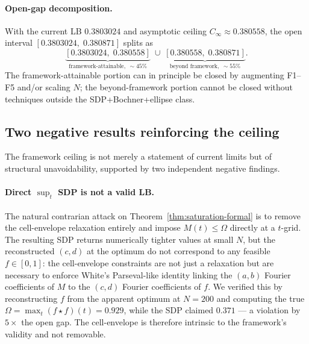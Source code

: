 \documentclass[11pt]{article}
\theoremstyle{plain}
\theoremstyle{definition}
\begin{document}
\paragraph{Open-gap decomposition.}
With the current LB $0.3803024$ and asymptotic ceiling
$C_\infty \approx 0.380558$, the open interval
$[0.3803024,\; 0.380871]$ splits as
\[
\underbrace{[0.3803024,\; 0.380558]}_{\text{framework-attainable},\;\sim 45\%}
\;\cup\;
\underbrace{[0.380558,\; 0.380871]}_{\text{beyond framework},\;\sim 55\%}.
\]
The framework-attainable portion can in principle be closed by
augmenting F1--F5 and/or scaling $N$; the beyond-framework portion
cannot be closed without techniques outside the SDP+Bochner+ellipse
class.

\subsection{Two negative results reinforcing the ceiling}

The framework ceiling is not merely a statement of current limits but
of structural unavoidability, supported by two independent negative
findings.

\paragraph{Direct $\sup_t$ SDP is not a valid LB.} The natural
contrarian attack on Theorem~\ref{thm:saturation-formal} is to remove
the cell-envelope relaxation entirely and impose $M(t) \le \Omega$
directly at a $t$-grid. The resulting SDP returns numerically tighter
values at small $N$, but the reconstructed $(c, d)$ at the optimum do
not correspond to any feasible $f \in [0, 1]$: the cell-envelope
constraints are not just a relaxation but are necessary to enforce
White's Parseval-like identity linking the $(a, b)$ Fourier
coefficients of $M$ to the $(c, d)$ Fourier coefficients of $f$. We
verified this by reconstructing $f$ from the apparent optimum at
$N = 200$ and computing the true $\Omega = \max_t (f \star f)(t) =
0.929$, while the SDP claimed $0.371$ — a violation by $5\times$ the
open gap. The cell-envelope is therefore intrinsic to the framework's
validity and not removable.
\end{document}
